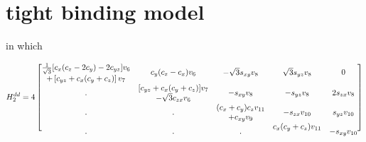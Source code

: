 \documentclass[twocolumn,showpacs,preprintnumbers,superscriptaddress,prb,floatfix,aps,10pt]{revtex4-1}
\begin{document}
%
%
\section{tight binding model}
\label{appendix:tb}













in which
\begin{widetext}
\begin{equation}
H_2^{dd} = 4
\begin{bmatrix}
 \tfrac{1}{\sqrt{3}} [c_{x} (c_{z}-2 c_{y})-2 c_{yz}] v_{6} & \multirow{2}{*}{$c_{y} (c_{z}-c_{x}) v_{6}$}    & \multirow{2}{*}{$-\sqrt{3} s_{xy} v_{8}$} & \multirow{2}{*}{$\sqrt{3} s_{yz} v_{8}$} & \multirow{2}{*}{$0$}               \\
             +\left[c_{yz}+c_{x} (c_{y}+c_{z})\right] v_{7} &                                                 &                                           &                                          &                                    \\
\multirow{2}{*}{.}                                          &     [c_{yz}+c_{x} (c_{y}+c_{z})] v_{7}          & \multirow{2}{*}{$-s_{xy} v_{8}$}          & \multirow{2}{*}{$-s_{yz} v_{8}$}         & \multirow{2}{*}{$2 s_{zx} v_{8}$}  \\ 
                                                            &                 -\sqrt{3} c_{zx} v_{6}          &                                           &                                          &                                    \\
\multirow{2}{*}{.}                                          & \multirow{2}{*}{.}                              &      (c_{x}+c_{y}) c_{z} v_{11}           & \multirow{2}{*}{$-s_{zx} v_{10}$}        & \multirow{2}{*}{$ s_{yz} v_{10}$}  \\    
                                                            &                                                 &                  +c_{xy} v_{9}            &                                          &                                    \\
\multirow{2}{*}{.}                                          & \multirow{2}{*}{.}                              & \multirow{2}{*}{.}                        &      c_{x} (c_{y}+c_{z}) v_{11}          & \multirow{2}{*}{$-s_{xy} v_{10}$}  \\

\end{bmatrix}
\end{equation}
\end{widetext}
\end{document}
